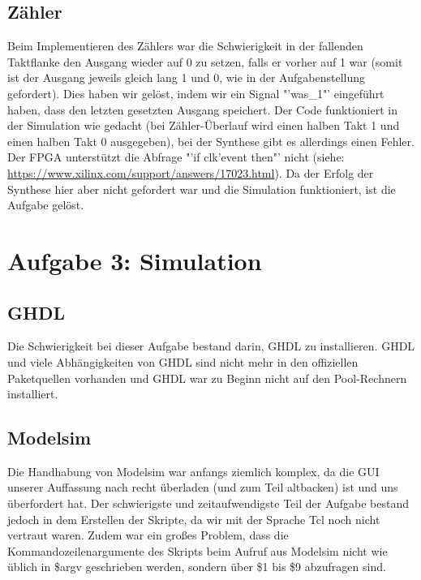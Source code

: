 \documentclass[parskip=full]{scrartcl}
\begin{document}
		\subsection{Zähler}
			Beim Implementieren des Zählers war die Schwierigkeit in der fallenden Taktflanke den Ausgang wieder auf 0 zu setzen, falls er vorher auf 1 war (somit ist der Ausgang jeweils gleich lang 1 und 0, wie in der Aufgabenstellung gefordert). Dies haben wir gelöst, indem wir ein Signal "'was\_1"' eingeführt haben, dass den letzten gesetzten Ausgang speichert. Der Code funktioniert in der Simulation wie gedacht (bei Zähler-Überlauf wird einen halben Takt 1 und einen halben Takt 0 ausgegeben), bei der Synthese gibt es allerdings einen Fehler. Der FPGA unterstützt die Abfrage "'if clk'event then"' nicht (siehe: \url{https://www.xilinx.com/support/answers/17023.html}). Da der Erfolg der Synthese hier aber nicht gefordert war und die Simulation funktioniert, ist die Aufgabe gelöst.
			
	\section*{Aufgabe 3: Simulation}
		\setcounter{section}{3}
		\setcounter{subsection}{0}
		\subsection{GHDL}
			Die Schwierigkeit bei dieser Aufgabe bestand darin, GHDL zu installieren. GHDL und viele Abhängigkeiten von GHDL sind nicht mehr in den offiziellen Paketquellen vorhanden und GHDL war zu Beginn nicht auf den Pool-Rechnern installiert.
		\subsection{Modelsim}
			Die Handhabung von Modelsim war anfangs ziemlich komplex, da die GUI unserer Auffassung nach recht überladen (und zum Teil altbacken) ist und uns überfordert hat. Der schwierigste und zeitaufwendigste Teil der Aufgabe bestand jedoch in dem Erstellen der Skripte, da wir mit der Sprache Tcl noch nicht vertraut waren. Zudem war ein großes Problem, dass die Kommandozeilenargumente des Skripts beim Aufruf aus Modelsim nicht wie üblich in \$argv geschrieben werden, sondern über \$1 bis \$9 abzufragen sind.
\end{document}
